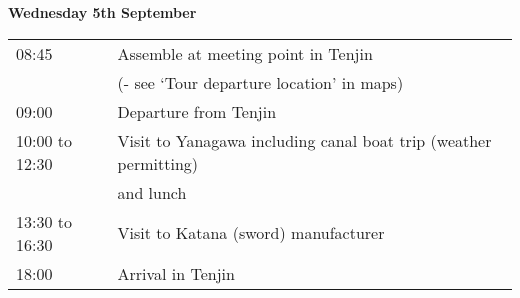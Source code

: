 \newpage
\begin{center}
{\bf \large Wednesday 5th September}
\end{center}
\vspace*{3ex}

\noindent\begin{tabular}{|l|l|}
    \hline
    08:45           & Assemble at meeting point in Tenjin \\
                    & \hspace*{4em} (- see `Tour departure location' in maps) \\
    09:00           & Departure from Tenjin \\
    10:00 to 12:30  & Visit to Yanagawa including canal boat trip (weather permitting) \\
                    & and lunch\\
    13:30 to 16:30  & Visit to Katana (sword) manufacturer \\
    18:00           & Arrival in Tenjin\\
    \hline
\end{tabular}
